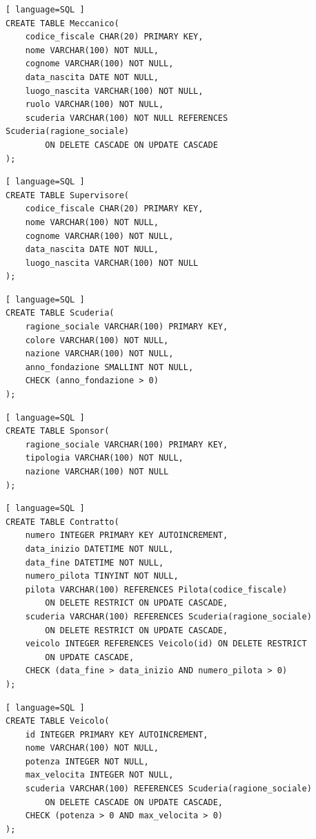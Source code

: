 \documentclass[11pt]{article}
\begin{document}
\begin{lstlisting}[ language=SQL ]
CREATE TABLE Meccanico(
    codice_fiscale CHAR(20) PRIMARY KEY,
    nome VARCHAR(100) NOT NULL,
    cognome VARCHAR(100) NOT NULL,
    data_nascita DATE NOT NULL,
    luogo_nascita VARCHAR(100) NOT NULL,
    ruolo VARCHAR(100) NOT NULL,
    scuderia VARCHAR(100) NOT NULL REFERENCES Scuderia(ragione_sociale) 
        ON DELETE CASCADE ON UPDATE CASCADE
);
\end{lstlisting}

\begin{lstlisting}[ language=SQL ]
CREATE TABLE Supervisore(
    codice_fiscale CHAR(20) PRIMARY KEY,
    nome VARCHAR(100) NOT NULL,
    cognome VARCHAR(100) NOT NULL,
    data_nascita DATE NOT NULL,
    luogo_nascita VARCHAR(100) NOT NULL
);
\end{lstlisting}

\begin{lstlisting}[ language=SQL ]
CREATE TABLE Scuderia(
    ragione_sociale VARCHAR(100) PRIMARY KEY,
    colore VARCHAR(100) NOT NULL,
    nazione VARCHAR(100) NOT NULL,
    anno_fondazione SMALLINT NOT NULL,
    CHECK (anno_fondazione > 0)
);
\end{lstlisting}

\begin{lstlisting}[ language=SQL ]
CREATE TABLE Sponsor(
    ragione_sociale VARCHAR(100) PRIMARY KEY,
    tipologia VARCHAR(100) NOT NULL,
    nazione VARCHAR(100) NOT NULL
);
\end{lstlisting}

\begin{lstlisting}[ language=SQL ]
CREATE TABLE Contratto(
    numero INTEGER PRIMARY KEY AUTOINCREMENT,
    data_inizio DATETIME NOT NULL,
    data_fine DATETIME NOT NULL,
    numero_pilota TINYINT NOT NULL,
    pilota VARCHAR(100) REFERENCES Pilota(codice_fiscale) 
        ON DELETE RESTRICT ON UPDATE CASCADE,
    scuderia VARCHAR(100) REFERENCES Scuderia(ragione_sociale) 
        ON DELETE RESTRICT ON UPDATE CASCADE,
    veicolo INTEGER REFERENCES Veicolo(id) ON DELETE RESTRICT 
        ON UPDATE CASCADE,
    CHECK (data_fine > data_inizio AND numero_pilota > 0)
);
\end{lstlisting}

\begin{lstlisting}[ language=SQL ]
CREATE TABLE Veicolo(
    id INTEGER PRIMARY KEY AUTOINCREMENT,
    nome VARCHAR(100) NOT NULL,
    potenza INTEGER NOT NULL,
    max_velocita INTEGER NOT NULL,
    scuderia VARCHAR(100) REFERENCES Scuderia(ragione_sociale) 
        ON DELETE CASCADE ON UPDATE CASCADE,
    CHECK (potenza > 0 AND max_velocita > 0)
);
\end{lstlisting}
\end{document}
